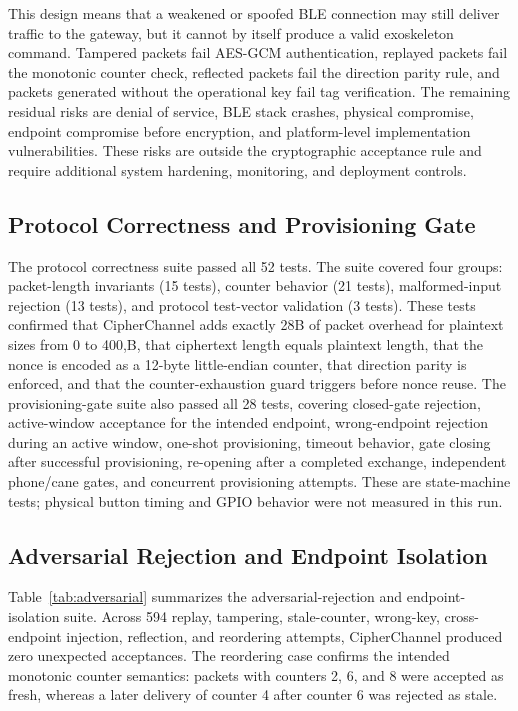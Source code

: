 \documentclass[journal]{IEEEtran}
\begin{document}
This design means that a weakened or spoofed BLE connection may still deliver traffic to the gateway, but it cannot by itself produce a valid exoskeleton command. Tampered packets fail AES-GCM authentication, replayed packets fail the monotonic counter check, reflected packets fail the direction parity rule, and packets generated without the operational key fail tag verification. The remaining residual risks are denial of service, BLE stack crashes, physical compromise, endpoint compromise before encryption, and platform-level implementation vulnerabilities. These risks are outside the cryptographic acceptance rule and require additional system hardening, monitoring, and deployment controls.



\subsection{Protocol Correctness and Provisioning Gate}

The protocol correctness suite passed all 52 tests. The suite covered four groups: packet-length invariants (15 tests), counter behavior (21 tests), malformed-input rejection (13 tests), and protocol test-vector validation (3 tests). These tests confirmed that CipherChannel adds exactly 28B of packet overhead for plaintext sizes from 0 to 400,B, that ciphertext length equals plaintext length, that the nonce is encoded as a 12-byte little-endian counter, that direction parity is enforced, and that the counter-exhaustion guard triggers before nonce reuse. The provisioning-gate suite also passed all 28 tests, covering closed-gate rejection, active-window acceptance for the intended endpoint, wrong-endpoint rejection during an active window, one-shot provisioning, timeout behavior, gate closing after successful provisioning, re-opening after a completed exchange, independent phone/cane gates, and concurrent provisioning attempts. These are state-machine tests; physical button timing and GPIO behavior were not measured in this run.

\subsection{Adversarial Rejection and Endpoint Isolation}

Table~\ref{tab:adversarial} summarizes the adversarial-rejection and endpoint-isolation suite. Across 594 replay, tampering, stale-counter, wrong-key, cross-endpoint injection, reflection, and reordering attempts, CipherChannel produced zero unexpected acceptances. The reordering case confirms the intended monotonic counter semantics: packets with counters 2, 6, and 8 were accepted as fresh, whereas a later delivery of counter 4 after counter 6 was rejected as stale.
\end{document}
